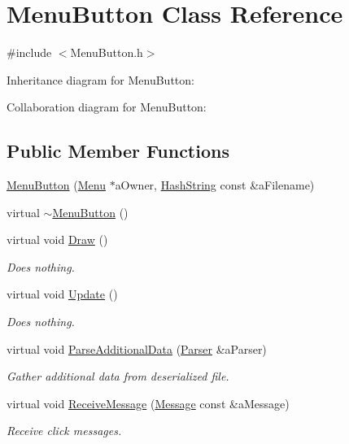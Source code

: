 \hypertarget{classMenuButton}{}\section{Menu\+Button Class Reference}
\label{classMenuButton}


{\ttfamily \#include $<$Menu\+Button.\+h$>$}



Inheritance diagram for Menu\+Button\+:


Collaboration diagram for Menu\+Button\+:
\subsection*{Public Member Functions}
\begin{DoxyCompactItemize}
\item 
\hyperlink{classMenuButton_a7fc26440d71fbb39142abc55dee93ca7}{Menu\+Button} (\hyperlink{classMenu}{Menu} $\ast$a\+Owner, \hyperlink{classHashString}{Hash\+String} const \&a\+Filename)
\item 
virtual \hyperlink{classMenuButton_a2cf52c32c95ed42bd06117a30eefc5e0}{$\sim$\+Menu\+Button} ()
\item 
virtual void \hyperlink{classMenuButton_aac414152e785dbc256aa307b23792143}{Draw} ()
\begin{DoxyCompactList}\small\item\em Does nothing. \end{DoxyCompactList}\item 
virtual void \hyperlink{classMenuButton_a929dfef7a69a776f4b1da3d151236dcb}{Update} ()
\begin{DoxyCompactList}\small\item\em Does nothing. \end{DoxyCompactList}\item 
virtual void \hyperlink{classMenuButton_a2e8ea938dfbfda31407f7aa672f1a607}{Parse\+Additional\+Data} (\hyperlink{classParser}{Parser} \&a\+Parser)
\begin{DoxyCompactList}\small\item\em Gather additional data from deserialized file. \end{DoxyCompactList}\item 
virtual void \hyperlink{classMenuButton_a6d4ea5866ebba20ea57d6c48a0c6fa20}{Receive\+Message} (\hyperlink{classMessage}{Message} const \&a\+Message)
\begin{DoxyCompactList}\small\item\em Receive click messages. \end{DoxyCompactList}\item 

\end{DoxyCompactItemize}
